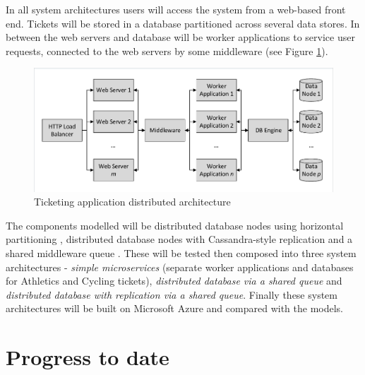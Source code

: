 \documentclass{llncs}
\begin{document}
In all system architectures users will access the system from a web-based front end.  Tickets will be stored in a database partitioned across several data stores.  In between the web servers and database will be worker applications to service user requests, connected to the web servers by some middleware (see Figure \ref{figure:architecture}).

\begin{figure}
	\caption{Ticketing application distributed architecture}
	\label{figure:architecture}
	\centering
	\includegraphics[trim = 5 5 5 5, clip, width=\textwidth]{img/application}
\end{figure}

The components modelled will be distributed database nodes using horizontal partitioning \cite{RN68}, distributed database nodes with Cassandra-style replication \cite{RN1050} and a shared middleware queue \cite{RN65}.  These will be tested then composed into three system architectures - \textit{simple microservices} (separate worker applications and databases for Athletics and Cycling tickets), \textit{distributed database via a shared queue}  and \textit{distributed database with replication via a shared queue}.  Finally these system architectures will be built on Microsoft Azure and compared with the models.

%
%

\section{Progress to date}
\end{document}
